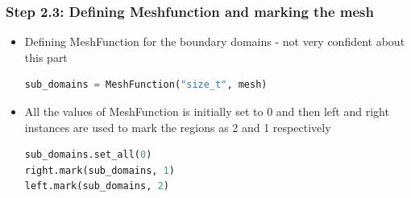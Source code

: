 \documentclass{beamer}
\begin{document}
 \begin{frame}[fragile]
\frametitle{ Step 2.3: Defining Meshfunction and marking the mesh}
\begin{itemize}
		\vfill
		\item{Defining MeshFunction for the boundary domains - not very confident about this part}
		\begin{lstlisting}[language=Python, basicstyle=\ttfamily\small,  keywordstyle=\color{blue}]
sub_domains = MeshFunction("size_t", mesh)

\end{lstlisting}
		\vfill
		\item{All the values of MeshFunction is initially set to 0 and then left and right instances are used to mark the regions as 2 and 1 respectively}
		\begin{lstlisting}[language=Python, basicstyle=\ttfamily\small,  keywordstyle=\color{blue}]
sub_domains.set_all(0)
right.mark(sub_domains, 1)
left.mark(sub_domains, 2)

\end{lstlisting}	

\end{itemize}
\end{frame}
\end{document}
